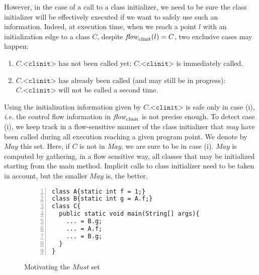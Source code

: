 \documentclass{entcs}
\newcommand{\clinit}{\ensuremath{\texttt{<clinit>}}}
\newcommand{\may}{\ensuremath{\mathit{May}}}
\newcommand{\must}{\ensuremath{\mathit{Must}}}
\newcommand{\flow}{\mathit{flow}}
\newcommand{\clinitflow}{\flow_{\rm clinit}}
\begin{document}
However, in the case of a call to a class initializer, we need to be
sure the class initializer will be effectively executed if we want to
safely use such an information.  Indeed, at execution time, when we
reach a point $l$ with an initialization edge to a class $C$, despite
$\clinitflow(l)=C$, two exclusive cases may happen:
\begin{enumerate}
\item $C.\clinit$ has not been called yet: $C.\clinit$ is immediately
  called.
\item $C.\clinit$ has already been called (and may still be in
  progress): $C.\clinit$ will not be called a second time.
\end{enumerate}
Using the initialization information given by $C.\clinit$ is safe only
in case (i), \emph{i.e.} the control flow information in $\clinitflow$
is not precise enough.  To detect case {(i)}, we keep track in a
flow-sensitive manner of the class initializer that \emph{may} have
been called during all execution reaching a given program point.  We
denote by $\may$ this set.  Here, if $C$ is not in $\may$, we are sure
to be in case {(i)}.
$\may$ is computed by gathering, in a flow sensitive way, all classes
that may be initialized starting from the main method.  Implicit calls
to class initializer need to be taken in account, but the smaller
$\may$ is, the better.




\begin{figure}
  \centering
  \begin{minipage}{.8\linewidth}
\begin{lstlisting}[numbers=left]
class A{static int f = 1;}
class B{static int g = A.f;}
class C{
  public static void main(String[] args){
    ... = B.g;
    ... = A.f;
    ... = B.g;
  }
}
\end{lstlisting}
  \end{minipage}
  \caption{Motivating the \must{} set}
  \label{fig:motivating-must-set}
\end{figure}
\end{document}
